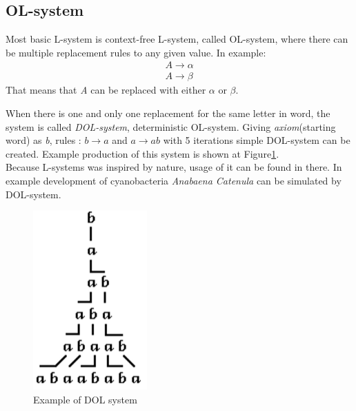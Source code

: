\documentclass[b5paper,twoside,11pt]{article}
\renewcommand{\figurename}{Figure}
\begin{document}
\subsection{OL-system}
Most basic L-system is context-free L-system, called OL-system, where there can be multiple replacement rules to any given value. In example:
\begin{equation}
\begin{aligned}
A \longrightarrow \alpha \\
A \longrightarrow \beta
\end{aligned}
\end{equation}
That means that \textit{A} can be replaced with either $\alpha$ or $\beta$.\\
\par When there is one and only one replacement for the same letter in word, the system is called \textit{DOL-system}, deterministic OL-system.
Giving \textit{axiom}(starting word) as \textit{b}, rules : $b \rightarrow a$ and $a \rightarrow ab$ with 5 iterations simple DOL-system can be created. Example production of this system is shown at \figurename\ref{DOL}.\\
Because L-systems was inspired by nature, usage of it can be found in there. In example  development of cyanobacteria \textit{Anabaena Catenula} can be simulated by DOL-system.
\begin{figure}[!htp]
\centering
  \includegraphics[width=0.15\linewidth]{DOL-system}
\caption{Example of DOL system\cite{prusinABOP} \label{DOL}}
\end{figure}
\end{document}
